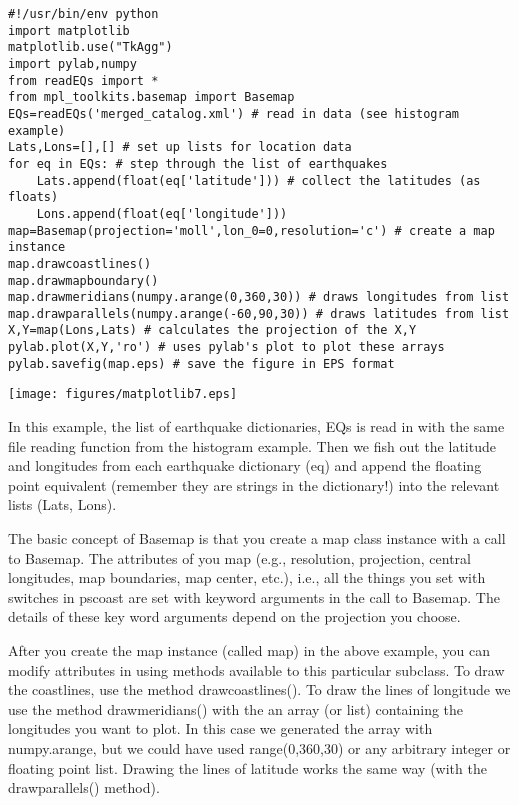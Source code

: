 {{{\singlespacing \color{blue} \begin{verbatim}
#!/usr/bin/env python
import matplotlib
matplotlib.use("TkAgg")
import pylab,numpy
from readEQs import *
from mpl_toolkits.basemap import Basemap
EQs=readEQs('merged_catalog.xml') # read in data (see histogram example)
Lats,Lons=[],[] # set up lists for location data
for eq in EQs: # step through the list of earthquakes
    Lats.append(float(eq['latitude'])) # collect the latitudes (as floats)
    Lons.append(float(eq['longitude']))
map=Basemap(projection='moll',lon_0=0,resolution='c') # create a map instance
map.drawcoastlines()
map.drawmapboundary()
map.drawmeridians(numpy.arange(0,360,30)) # draws longitudes from list
map.drawparallels(numpy.arange(-60,90,30)) # draws latitudes from list
X,Y=map(Lons,Lats) # calculates the projection of the X,Y
pylab.plot(X,Y,'ro') # uses pylab's plot to plot these arrays
pylab.savefig(map.eps) # save the figure in EPS format
\end{verbatim}}

\texttt{[image: figures/matplotlib7.eps]}

\noindent
In this example, the list of earthquake dictionaries, {\color{blue}EQs} is read in with the same file reading function from the histogram example.   Then we fish out the latitude and longitudes from each earthquake dictionary ({\color{blue}eq}) and append the floating point equivalent (remember they are strings in the dictionary!) into the relevant lists (Lats, Lons).  

The basic concept of Basemap is that you create a map class instance with a call to {\color{blue}Basemap}.  The attributes of you map (e.g., resolution, projection, central longitudes, map boundaries, map center, etc.), i.e., all the things you set with switches in {\color{blue}pscoast} are set with keyword arguments in the call to Basemap.  The details of these key word arguments depend on the projection you choose.  

After you create the map instance (called {\color{blue}map}) in the above example, you can modify attributes in using methods available to this particular subclass.  To draw the coastlines, use the method {\color{blue}drawcoastlines()}.  To draw the lines of longitude we use the method {\color{blue}drawmeridians()} with the an array (or list) containing the longitudes you want to plot. In this case we generated the array with {\color{blue}numpy.arange}, but we could have used {\color{blue}range(0,360,30)} or any arbitrary integer or floating point list.  
Drawing the lines of latitude works the same way (with the {\color{blue}drawparallels()} method).

}}
